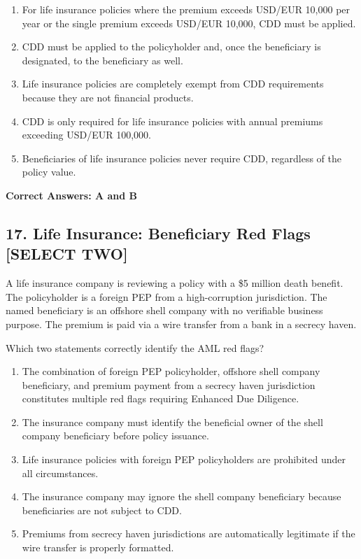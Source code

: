 \documentclass[11pt,a4paper]{article}
\begin{document}
	\begin{enumerate}[label=\Alph*.]
		\item For life insurance policies where the premium exceeds USD/EUR 10,000 per year or the single premium exceeds USD/EUR 10,000, CDD must be applied.
		\item CDD must be applied to the policyholder and, once the beneficiary is designated, to the beneficiary as well.
		\item Life insurance policies are completely exempt from CDD requirements because they are not financial products.
		\item CDD is only required for life insurance policies with annual premiums exceeding USD/EUR 100,000.
		\item Beneficiaries of life insurance policies never require CDD, regardless of the policy value.
	\end{enumerate}
	
	\textbf{Correct Answers: A and B}
	
	\subsection{17. Life Insurance: Beneficiary Red Flags \textnormal{[SELECT TWO]}}
	
	A life insurance company is reviewing a policy with a \$5 million death benefit. The policyholder is a foreign PEP from a high-corruption jurisdiction. The named beneficiary is an offshore shell company with no verifiable business purpose. The premium is paid via a wire transfer from a bank in a secrecy haven.
	
	Which two statements correctly identify the AML red flags?
	
	\begin{enumerate}[label=\Alph*.]
		\item The combination of foreign PEP policyholder, offshore shell company beneficiary, and premium payment from a secrecy haven jurisdiction constitutes multiple red flags requiring Enhanced Due Diligence.
		\item The insurance company must identify the beneficial owner of the shell company beneficiary before policy issuance.
		\item Life insurance policies with foreign PEP policyholders are prohibited under all circumstances.
		\item The insurance company may ignore the shell company beneficiary because beneficiaries are not subject to CDD.
		\item Premiums from secrecy haven jurisdictions are automatically legitimate if the wire transfer is properly formatted.
	\end{enumerate}
	
\end{document}
